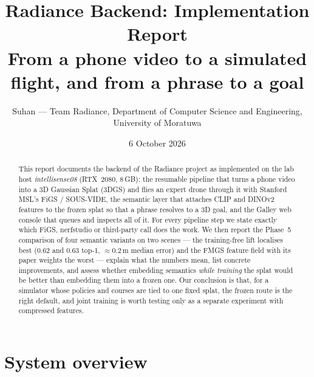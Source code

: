 \documentclass[11pt,a4paper]{article}
\title{Radiance Backend: Implementation Report\\[2pt]
\large From a phone video to a simulated flight, and from a phrase to a goal}
\author{Suhan --- Team Radiance, Department of Computer Science and Engineering,\\University of Moratuwa}
\date{6 October 2026}
\begin{document}
\maketitle

\begin{abstract}
This report documents the backend of the Radiance project as implemented on the lab host
\emph{intellisense08} (RTX~2080, 8\,GB): the resumable pipeline that turns a phone video into a
3D Gaussian Splat (3DGS) and flies an expert drone through it with Stanford MSL's FiGS / SOUS-VIDE,
the semantic layer that attaches CLIP and DINOv2 features to the frozen splat so that a phrase
resolves to a 3D goal, and the Galley web console that queues and inspects all of it. For every
pipeline step we state exactly which FiGS, nerfstudio or third-party call does the work. We then
report the Phase~5 comparison of four semantic variants on two scenes --- the training-free lift
localises best (0.62 and 0.63 top-1, $\approx$0.2\,m median error) and the FMGS feature field with
its paper weights the worst --- explain what the numbers mean, list concrete improvements, and
assess whether embedding semantics \emph{while training} the splat would be better than embedding
them into a frozen one. Our conclusion is that, for a simulator whose policies and courses are tied
to one fixed splat, the frozen route is the right default, and joint training is worth testing
only as a separate experiment with compressed features.
\end{abstract}

\tableofcontents
\newpage

\section{System overview}
\end{document}
